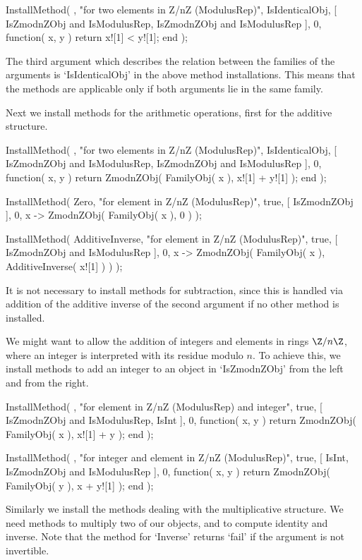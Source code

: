     InstallMethod( \<,
        "for two elements in Z/nZ (ModulusRep)",
        IsIdenticalObj,
        [ IsZmodnZObj and IsModulusRep, IsZmodnZObj and IsModulusRep ],
        0,
        function( x, y ) return x![1] < y![1]; end );
\endtt

The third argument which describes the relation between the families of
the arguments is `IsIdenticalObj' in the above method installations.
This means that the methods are applicable only if both arguments lie in
the same family.

Next we install methods for the arithmetic operations,
first for the additive structure.

\begintt
    InstallMethod( \+,
        "for two elements in Z/nZ (ModulusRep)",
        IsIdenticalObj,
        [ IsZmodnZObj and IsModulusRep, IsZmodnZObj and IsModulusRep ],
        0,
        function( x, y )
        return ZmodnZObj( FamilyObj( x ), x![1] + y![1] );
        end );

    InstallMethod( Zero,
        "for element in Z/nZ (ModulusRep)",
        true,
        [ IsZmodnZObj ], 0,
        x -> ZmodnZObj( FamilyObj( x ), 0 ) );

    InstallMethod( AdditiveInverse,
        "for element in Z/nZ (ModulusRep)",
        true,
        [ IsZmodnZObj and IsModulusRep ], 0,
        x -> ZmodnZObj( FamilyObj( x ), AdditiveInverse( x![1] ) ) );
\endtt

It is not necessary to install methods for subtraction,
since this is handled via addition of the additive inverse of
the second argument if no other method is installed.

We might want to allow the addition of integers and elements in
rings $\Z/n\Z$, where an integer is interpreted with its residue modulo
$n$.
To achieve this, we install methods to add an integer to an object in
`IsZmodnZObj' from the left and from the right.

\begintt
    InstallMethod( \+,
        "for element in Z/nZ (ModulusRep) and integer",
        true,
        [ IsZmodnZObj and IsModulusRep, IsInt ], 0,
        function( x, y )
        return ZmodnZObj( FamilyObj( x ), x![1] + y );
        end );

    InstallMethod( \+,
        "for integer and element in Z/nZ (ModulusRep)",
        true,
        [ IsInt, IsZmodnZObj and IsModulusRep ], 0,
        function( x, y )
        return ZmodnZObj( FamilyObj( y ), x + y![1] );
        end );
\endtt

Similarly we install the methods dealing with the multiplicative
structure.
We need methods to multiply two of our objects,
and to compute identity and inverse.
Note that the method for `Inverse' returns `fail' if the argument
is not invertible.

